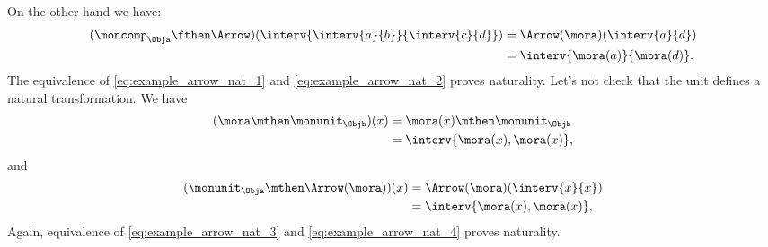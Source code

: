 %
On the other hand we have:
%
\begin{equation}
    \label{eq:example_arrow_nat_2}
    \begin{aligned}
        (\moncomp_\Obja \fthen \Arrow)(\interv{\interv{a}{b}}{\interv{c}{d}})
         & =\Arrow(\mora)(\interv{a}{d}) \\
         & =\interv{\mora(a)}{\mora(d)}.
    \end{aligned}
\end{equation}
%
The equivalence of \cref{eq:example_arrow_nat_1} and \cref{eq:example_arrow_nat_2} proves naturality.
Let's not check that the unit defines a natural transformation.
We have
%
\begin{equation}
    \label{eq:example_arrow_nat_3}
    \begin{aligned}
        (\mora \mthen \monunit_\Objb)(x)
         & =\mora(x)\mthen \monunit_\Objb \\
         & =\interv{\mora(x),\mora(x)},
    \end{aligned}
\end{equation}
%
and
%
\begin{equation}
    \label{eq:example_arrow_nat_4}
    \begin{aligned}
        (\monunit_\Obja \mthen \Arrow(\mora))(x)
         & =\Arrow(\mora)(\interv{x}{x}) \\
         & =\interv{\mora(x),\mora(x)},
    \end{aligned}
\end{equation}
%
Again, equivalence of \cref{eq:example_arrow_nat_3} and \cref{eq:example_arrow_nat_4} proves naturality.

